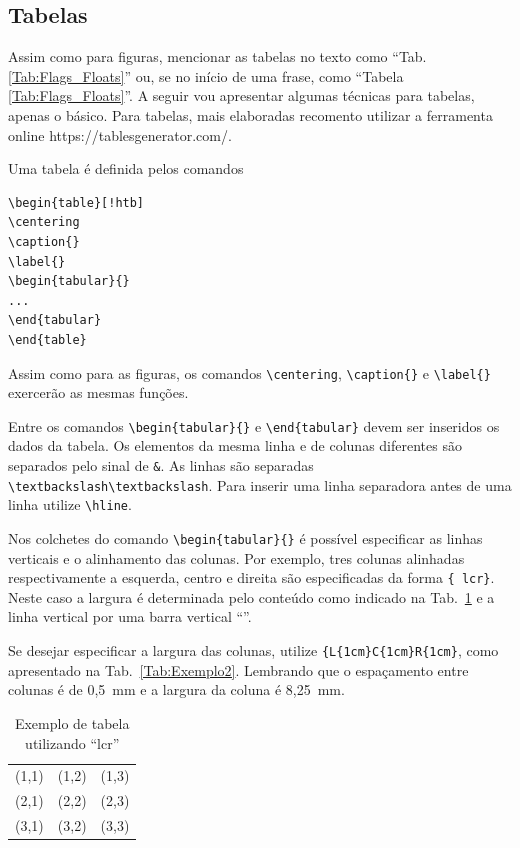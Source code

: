 \documentclass{RBClatex}
\begin{document}
\subsection{Tabelas}

Assim como para figuras, mencionar as tabelas no texto como ``Tab. \ref{Tab:Flags_Floats}'' ou, se no início de uma frase, como ``Tabela \ref{Tab:Flags_Floats}''. A seguir vou apresentar algumas técnicas para tabelas, apenas o básico. Para tabelas, mais elaboradas recomento utilizar a ferramenta online https://tablesgenerator.com/.

Uma tabela é definida pelos comandos
\begin{lstlisting}
\begin{table}[!htb]
\centering
\caption{}
\label{}
\begin{tabular}{}
...
\end{tabular}
\end{table}
\end{lstlisting}

Assim como para as figuras, os comandos \verb|\centering|, \verb|\caption{}| e \verb|\label{}| exercerão as mesmas funções.

Entre os comandos \verb|\begin{tabular}{}| e \verb|\end{tabular}| devem ser inseridos os dados da tabela. Os elementos da mesma linha e de colunas diferentes são separados pelo sinal de \verb|&|. As linhas são separadas \verb|\textbackslash\textbackslash|. Para inserir uma linha separadora antes de uma linha utilize \verb|\hline|.

Nos colchetes do comando \verb|\begin{tabular}{}| é possível especificar as linhas verticais e o alinhamento das colunas. Por exemplo, tres colunas alinhadas respectivamente a esquerda, centro e direita são especificadas da forma \verb|{ lcr}|. Neste caso a largura é determinada pelo conteúdo como indicado na Tab.~\ref{Tab:Exemplo1} e a linha vertical por uma barra vertical ``\textbar''. 

Se desejar especificar a largura das colunas, utilize \verb|{L{1cm}C{1cm}R{1cm}|, como apresentado na Tab.~\ref{Tab:Exemplo2}. Lembrando que o espaçamento entre colunas é de 0,5~mm e a largura da coluna é 8,25~mm.

\begin{table}[!htb]
	\centering
	\caption{Exemplo de tabela utilizando ``lcr''}
	\label{Tab:Exemplo1}
	\begin{tabular}{|lcr|}
		\hline
		(1,1) & (1,2) & (1,3) \\ 
		(2,1) & (2,2) & (2,3) \\ 
		(3,1) & (3,2) & (3,3) \\ \hline
	\end{tabular}
\end{table}
\end{document}

